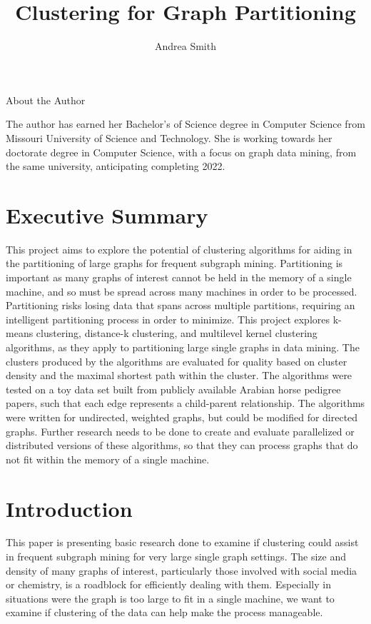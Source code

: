 \documentclass[12pt]{article}
\title{Clustering for Graph Partitioning}
\author{Andrea Smith}
\begin{document}
\begin{titlingpage}
\setlength{\droptitle}{30pt}
\maketitle
\begin{center}
{\selectfont
\large\centerline{About the Author}
}
The author has earned her Bachelor's of Science degree in Computer Science from Missouri University of Science and Technology. She is working towards her doctorate degree in Computer Science, with a focus on graph data mining, from the same university, anticipating completing 2022.
\end{center}
\end{titlingpage}

\tableofcontents

\newpage
\section{Executive Summary}
This project aims to explore the potential of clustering algorithms for aiding in the partitioning of large graphs for frequent subgraph mining. Partitioning is important as many graphs of interest cannot be held in the memory of a single machine, and so must be spread across many machines in order to be processed. Partitioning risks losing data that spans across multiple partitions, requiring an intelligent partitioning process in order to minimize. 
\newline\newline
This project explores k-means clustering, distance-k clustering, and multilevel kernel clustering algorithms, as they apply to partitioning large single graphs in data mining. The clusters produced by the algorithms are evaluated for quality based on cluster density and the maximal shortest path within the cluster. The algorithms were tested on a toy data set built from publicly available Arabian horse pedigree papers, such that each edge represents a child-parent relationship. The algorithms were written for undirected, weighted graphs, but could be modified for directed graphs.
\newline\newline
Further research needs to be done to create and evaluate parallelized or distributed versions of these algorithms, so that they can process graphs that do not fit within the memory of a single machine.

\newpage
\section{Introduction}
This paper is presenting basic research done to examine if clustering could assist in frequent subgraph mining for very large single graph settings. The size and density of many graphs of interest, particularly those involved with social media or chemistry, is a roadblock for efficiently dealing with them. Especially in situations were the graph is too large to fit in a single machine, we want to examine if clustering of the data can help make the process manageable.
\end{document}

